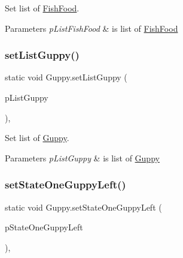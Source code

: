 Set list of \mbox{\hyperlink{class_fish_food}{Fish\+Food}}.


\begin{DoxyParams}{Parameters}
{\em p\+List\+Fish\+Food} & is list of \mbox{\hyperlink{class_fish_food}{Fish\+Food}} \\
\hline
\end{DoxyParams}
\mbox{\label{class_guppy_a87b2657fb98da613855fc016efa5e9d5}} 
\subsubsection{\texorpdfstring{set\+List\+Guppy()}{setListGuppy()}}
{\footnotesize\ttfamily static void Guppy.\+set\+List\+Guppy (\begin{DoxyParamCaption}\item[{final \mbox{\hyperlink{class_linked_list}{Linked\+List}}$<$ \mbox{\hyperlink{class_guppy}{Guppy}} $>$}]{p\+List\+Guppy }\end{DoxyParamCaption})\hspace{0.3cm}{\ttfamily [inline]}, {\ttfamily [static]}}

Set list of \mbox{\hyperlink{class_guppy}{Guppy}}.


\begin{DoxyParams}{Parameters}
{\em p\+List\+Guppy} & is list of \mbox{\hyperlink{class_guppy}{Guppy}} \\
\hline
\end{DoxyParams}
\mbox{\label{class_guppy_a9a8f6225f0482e0bd57a81f51310257c}} 
\subsubsection{\texorpdfstring{set\+State\+One\+Guppy\+Left()}{setStateOneGuppyLeft()}}
{\footnotesize\ttfamily static void Guppy.\+set\+State\+One\+Guppy\+Left (\begin{DoxyParamCaption}\item[{final Buffered\+Image}]{p\+State\+One\+Guppy\+Left }\end{DoxyParamCaption})\hspace{0.3cm}{\ttfamily [inline]}, {\ttfamily [static]}}

